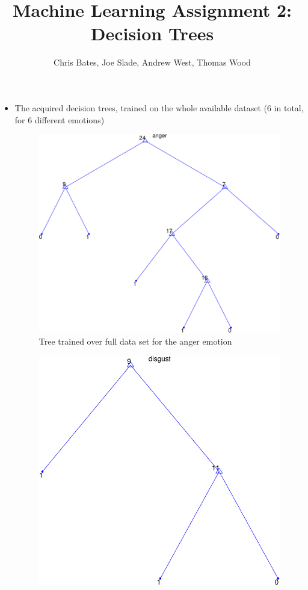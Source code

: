 \documentclass[a4paper]{article}
\title{Machine Learning Assignment 2: Decision Trees}
\author{Chris Bates, Joe Slade, Andrew West, Thomas Wood}
\begin{document}
\maketitle

\begin{itemize}
  \item The acquired decision trees, trained on the whole available dataset (6
    in total, for 6 different emotions)

    \begin{figure}[h]
      \centering
      \includegraphics[scale=0.5]{graph-anger}
      \caption{Tree trained over full data set for the anger emotion}
    \end{figure}
    \begin{figure}[h]
      \centering
      \includegraphics[scale=0.5]{graph-disgust}

\end{figure}
\end{itemize}
\end{document}

